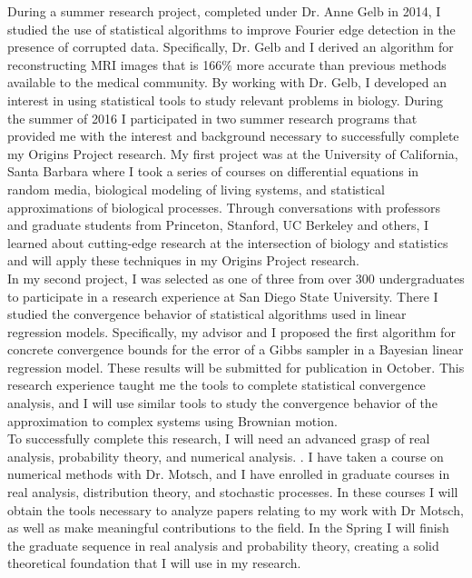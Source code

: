 \documentclass[8 pt, leqno]{article}
\begin{document}
\indent During a summer research project, completed under Dr. Anne Gelb in 2014, I studied the use of statistical algorithms to improve Fourier edge detection in the presence of corrupted data. Specifically, Dr. Gelb and I derived an algorithm for reconstructing MRI images that is 166$\%$ more accurate than previous methods available to the medical community. By working with Dr. Gelb, I developed an interest in using statistical tools to study relevant problems in biology. During the summer of 2016 I participated in two summer research programs that provided me with the interest and background necessary to successfully complete my Origins Project research. My first project was at the University of California, Santa Barbara where I took a series of courses on differential equations in random media, biological modeling of living systems, and statistical approximations of biological processes. Through conversations with professors and graduate students from Princeton, Stanford, UC Berkeley and others, I learned about cutting-edge research at the intersection of biology and statistics and will apply these techniques in my Origins Project research.\\
\indent In my second project, I was selected as one of three from over 300 undergraduates to participate in a research experience at San Diego State University. There I studied the convergence behavior of statistical algorithms used in linear regression models. Specifically, my advisor and I proposed the first algorithm for concrete convergence bounds for the error of a Gibbs sampler in a Bayesian linear regression model. These results will be submitted for publication in October. This research experience taught me the tools to complete statistical convergence analysis, and I will use similar tools to study the convergence behavior of the approximation to complex systems using Brownian motion. \\
\indent To successfully complete this research, I will need an advanced grasp of real analysis, probability theory, and numerical analysis. . I have taken a course on numerical methods with Dr. Motsch, and I have enrolled in graduate courses in real analysis, distribution theory, and stochastic processes. In these courses I will obtain the tools necessary to analyze papers relating to my work with Dr Motsch, as well as make meaningful contributions to the field. In the Spring I will finish the graduate sequence in real analysis and probability theory, creating a solid theoretical foundation that I will use in my research.\\
\end{document}
